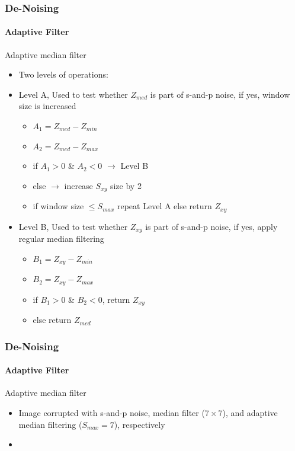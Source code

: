 \documentclass{beamer}
\begin{document}
\begin{frame}
\frametitle{De-Noising}
\framesubtitle{Adaptive Filter}
\begin{block}{Adaptive median filter}
\begin{itemize}
\item Two levels of operations: 
\item Level A, {\color{blue} Used to test whether $Z_{med}$ is part of s-and-p noise, if yes, window size is increased}
\begin{itemize}
	\item $A_{1} = Z_{med} - Z_{min}$
	\item $A_{2} = Z_{med} - Z_{max}$
	\item if $A_{1} > 0$ \& $A_{2} < 0$  $\rightarrow$ Level B
	\item else $\rightarrow$ increase $S_{xy}$ size by 2
	\item if window size $\leq S_{max}$ repeat Level A else return $Z_{xy}$
\end{itemize}
\item Level B, {\color{blue} Used to test whether $Z_{xy}$ is part of s-and-p noise, if yes, apply regular median filtering}
\begin{itemize}
	\item $B_{1} = Z_{xy} - Z_{min}$
	\item $B_{2} = Z_{xy} - Z_{max}$
	\item if $B_{1} > 0$ \& $B_{2} < 0$, return $Z_{xy}$ 
	\item else return $Z_{med}$ 
\end{itemize}
\end{itemize}
\end{block}
\end{frame}
\begin{frame}
\frametitle{De-Noising}
\framesubtitle{Adaptive Filter}
\begin{block}{Adaptive median filter}
\begin{itemize}
\item[]
\scriptsize{Image corrupted with s-and-p noise, median filter ($7 \times 7$), and adaptive median filtering ($S_{max} = 7$), respectively}\\
\item []
\end{itemize}
\end{block}
\end{frame}
\end{document}
